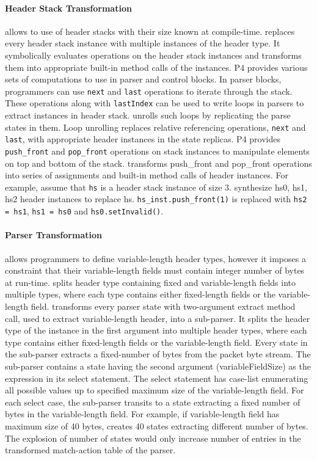 \documentclass[letterpaper,twocolumn,10pt]{article}
\begin{document}
\paragraph*{Header Stack Transformation}
\label{subsection:header-stack-transformation}
\ulang allows to use of header stacks with their size known at 
compile-time. 
\ucomp replaces every header stack instance with multiple instances of 
the header type. 
It symbolically evaluates operations on the header stack instances and 
transforms them into appropriate built-in method calls of the 
instances.
P4 provides various sets of computations to use in parser and control 
blocks.
In parser blocks, programmers can use \texttt{next} and \texttt{last} 
operations to iterate through the stack.
These operations along with \texttt{lastIndex} can be used to write 
loops in parsers to extract instances in header stack.
\ucomp unrolls such loops by replicating the parse states in them.
Loop unrolling replaces relative referencing operations, \texttt{next} 
and \texttt{last}, with appropriate header instances in the state 
replicas.
P4 provides \texttt{push\_front} and \texttt{pop\_front} operations on 
stack instances to manipulate elements on top and bottom of the stack.
\ucomp transforms push\_front and pop\_front operations into series of 
assignments and built-in method calls of header instances.
For example, assume that \texttt{hs} is a header stack instance of 
size 3. 
\ucomp synthesize hs0, hs1, hs2 header instances to replace hs.
\texttt{hs\_inst.push\_front(1)} is replaced with \texttt{hs2 = hs1}, 
\texttt{hs1 = hs0} and \texttt{hs0.setInvalid()}.


\paragraph*{Parser Transformation}
\label{subsection:header-stack-transformation}
\ulang allows programmers to define variable-length header types, 
however it imposes a constraint that their variable-length fields must 
contain integer number of bytes at run-time.
\ucomp splits header type containing fixed and variable-length 
fields into multiple types, where each type contains either 
fixed-length fields or the variable-length field.
\ucomp transforms every parser state with two-argument extract method 
call, used to extract variable-length header, into a sub-parser.
It splits the header type of the instance in the first argument into 
multiple header types, where each type contains either fixed-length 
fields or 
the variable-length field.
Every state in the sub-parser extracts a fixed-number of bytes from 
the packet byte stream.
The sub-parser contains a state having the second argument 
(variableFieldSize) as the expression in its select statement.
The select statement has case-list enumerating all possible values up 
to specified maximum size of the variable-length field.
For each select case, the sub-parser transits to a state extracting a 
fixed number of bytes in the variable-length field.
For example, if variable-length field has maximum size of 40 bytes, 
\ucomp creates 40 states extracting different number of bytes.
The explosion of number of states would only increase number of 
entries in the transformed match-action table of the parser.
\end{document}
